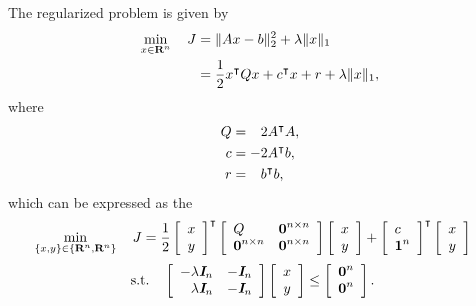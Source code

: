 \documentclass{article}
\begin{document}
    The regularized problem is given by
    \begin{align*}
        \min_{x\in\textbf{R}^n}\quad J
        &=
        \|Ax-b\|_2^2+\lambda\| x\|_1\\
        &=\frac{1}{2} x^\intercal Q x + c^\intercal x +r + \lambda\|x\|_1,
    \end{align*}
    where
    \begin{align*}
        Q
        &=
            \minus 2A^\tp A,
        \\
            c
        &=
            -2A^\tp b,
        \\
            r
        &=
        \minus b^\tp b,
    \end{align*}
    which can be expressed as the \QP
    \begin{align*}
        \min_{\{x,y\}\in\{\textbf{R}^n,\textbf{R}^n\}} \quad 
        J & = \frac{1}{2}
        \left[\begin{array}{c}
            x   \\
            y
        \end{array}\right]^\intercal
        \left[\begin{array}{ll}
            Q
        &
            \textbf{0}^{n\times n}
        \\ 
            \textbf{0}^{n\times n}
        &
            \textbf{0}^{n\times n}
        \end{array}\right]
        \left[\begin{array}{c}
            x   \\
            y
        \end{array}\right]
        +
        \left[\begin{array}{l}
            c
            \\
            \textbf{1}^{n}
        \end{array}\right]^\intercal
        \left[\begin{array}{c}
            x   \\
            y
        \end{array}\right]
    \end{align*}
    \begin{align*}
        \st\quad
        \left[\begin{array}{lll}
                -\lambda\eye_n
            &
                -\eye_n
            \\
                \minus \lambda\eye_n
            &
                -\eye_n
        \end{array}\right]
        \left[\begin{array}{c}
            x   \\
            y
        \end{array}\right]
        &\leq
        \left[\begin{array}{l}
            \zeros^n \\
            \zeros^n
        \end{array}\right].
    \end{align*}
\end{document}
